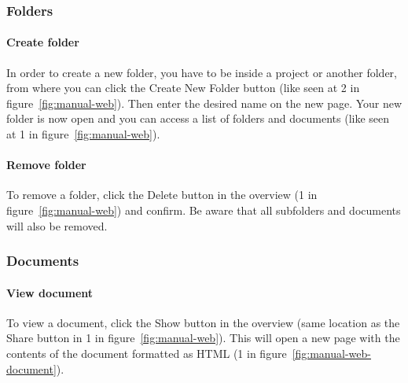 \subsubsection{Folders}

	\paragraph{Create folder}
	In order to create a new folder, you have to be inside a project or another folder, from where you can click the Create New Folder button (like seen at 2 in figure~\ref{fig:manual-web}). Then enter the desired name on the new page. Your new folder is now open and you can access a list of folders and documents (like seen at 1 in figure~\ref{fig:manual-web}).

	\paragraph{Remove folder}
	To remove a folder, click the Delete button in the overview (1 in figure~\ref{fig:manual-web}) and confirm. Be aware that all subfolders and documents will also be removed.

\subsubsection{Documents}

	\paragraph{View document}
	To view a document, click the Show button in the overview (same location as the Share button in 1 in figure~\ref{fig:manual-web}). This will open a new page with the contents of the document formatted as HTML (1 in figure~\ref{fig:manual-web-document}).
	
